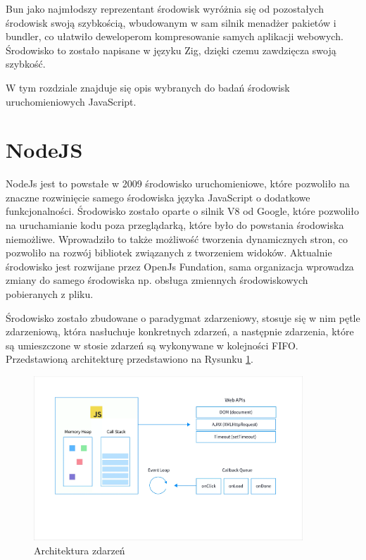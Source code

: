 Bun jako najmłodszy reprezentant środowisk wyróżnia się od pozostałych środowisk swoją szybkością, wbudowanym w sam silnik menadżer pakietów i bundler, co ułatwiło deweloperom kompresowanie samych aplikacji webowych. Środowisko to zostało napisane w języku Zig, dzięki czemu zawdzięcza swoją szybkość.

W tym rozdziale znajduje się opis wybranych do badań środowisk uruchomieniowych JavaScript.

\section*{NodeJS}
NodeJs jest to powstałe w 2009 środowisko uruchomieniowe, które pozwoliło na znaczne rozwinięcie samego środowiska języka JavaScript o dodatkowe funkcjonalności. Środowisko zostało oparte o silnik V8 od Google, które pozwoliło na uruchamianie kodu poza przeglądarką, które było do powstania środowiska niemożliwe. Wprowadziło to także możliwość tworzenia dynamicznych stron, co pozwoliło na rozwój bibliotek związanych z tworzeniem widoków. Aktualnie środowisko jest rozwijane przez OpenJs Fundation, sama organizacja wprowadza zmiany do samego środowiska np. obsługa zmiennych środowiskowych pobieranych z pliku.

Środowisko zostało zbudowane o paradygmat zdarzeniowy, stosuje się w nim pętle zdarzeniową, która nasłuchuje konkretnych zdarzeń, a następnie zdarzenia, które są umieszczone w stosie zdarzeń są wykonywane w kolejności FIFO. \cite{event_loop} Przedstawioną architekturę przedstawiono na Rysunku \ref{fig:eventLoop}.

\begin{figure}[h]
  \centering
  \includegraphics[width=0.9\textwidth]{Figures/eventLoop.png}
  \caption{Architektura zdarzeń}
  \label{fig:eventLoop}
\end{figure}

